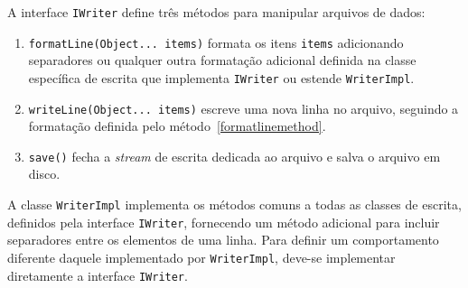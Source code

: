 A interface \texttt{IWriter} define três métodos para manipular arquivos de dados:

\begin{enumerate}
	\item \label{formatlinemethod} \texttt{formatLine(Object... items)} formata os itens \texttt{items} adicionando separadores ou qualquer outra formatação adicional definida na classe específica de escrita que implementa \texttt{IWriter} ou estende \texttt{WriterImpl}.
	\item \texttt{writeLine(Object... items)} escreve uma nova linha no arquivo, seguindo a formatação definida pelo método~\ref{formatlinemethod}.
	\item \texttt{save()} fecha a \textit{stream} de escrita dedicada ao arquivo e salva o arquivo em disco.
\end{enumerate}

A classe \texttt{WriterImpl} implementa os métodos comuns a todas as classes de escrita, definidos pela interface \texttt{IWriter}, fornecendo um método adicional para incluir separadores entre os elementos de uma linha. Para definir um comportamento diferente daquele implementado por \texttt{WriterImpl}, deve-se implementar diretamente a interface \texttt{IWriter}.






